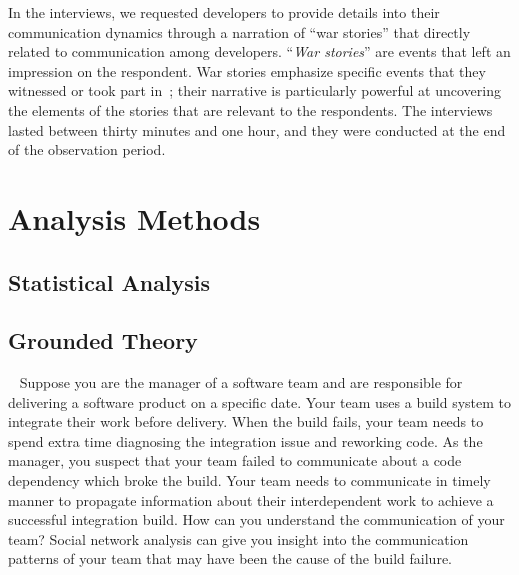 In the interviews, we requested developers to provide details into their communication dynamics through a narration of ``war stories'' that directly related to communication among developers. ``\emph{War stories}'' are events that left an impression on the respondent. War stories emphasize specific events that they witnessed or took part in~\cite{lutters:ist:2007}; their narrative is particularly powerful at uncovering the elements of the stories that are relevant to the respondents. The interviews lasted between thirty minutes and one hour, and they were conducted at the end of the observation period. 


\section{Analysis Methods}
\subsection{Statistical Analysis}
\subsection{Grounded Theory}




















\newpage\ \newpage
Suppose you are the manager of a software team and are responsible for delivering
a software product on a specific date. Your team uses a build system to integrate
their work before delivery. When the build fails, your team needs to spend extra
time diagnosing the integration issue and reworking code. As the manager, you
suspect that your team failed to communicate about a code dependency which broke
the build. Your team needs to communicate in timely manner to propagate
information about their interdependent work to achieve a successful integration
build. How can you understand the communication of your team? Social network
analysis can give you insight into the communication patterns of your team that
may have been the cause of the build failure.


